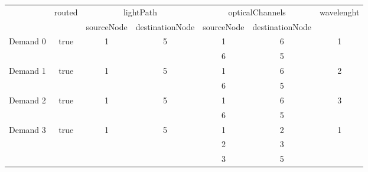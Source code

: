 \begin{table}[H]
	\centering
	\begin{tabular}{c|c|c|c|c|c|c|}
		\cline{2-7}
		\multicolumn{1}{l|}{}                           & \multirow{2}{*}{routed} & \multicolumn{2}{c|}{lightPath}          & \multicolumn{2}{c|}{opticalChannels} & \multirow{2}{*}{wavelenght} \\ \cline{3-6}
		\multicolumn{1}{l|}{}                           &                         & sourceNode         & destinationNode    & sourceNode     & destinationNode     &                             \\ \hline
		\multicolumn{1}{|l|}{\multirow{2}{*}{Demand 0}} & \multirow{2}{*}{true}   & \multirow{2}{*}{1} & \multirow{2}{*}{5} & 1              & 6                   & \multirow{2}{*}{1}          \\ \cline{5-6}
		\multicolumn{1}{|l|}{}                          &                         &                    &                    & 6              & 5                   &                             \\ \hline
		\multicolumn{1}{|l|}{\multirow{2}{*}{Demand 1}} & \multirow{2}{*}{true}   & \multirow{2}{*}{1} & \multirow{2}{*}{5} & 1              & 6                   & \multirow{2}{*}{2}          \\ \cline{5-6}
		\multicolumn{1}{|l|}{}                          &                         &                    &                    & 6              & 5                   &                             \\ \hline
		\multicolumn{1}{|c|}{\multirow{2}{*}{Demand 2}} & \multirow{2}{*}{true}   & \multirow{2}{*}{1} & \multirow{2}{*}{5} & 1              & 6                   & \multirow{2}{*}{3}          \\ \cline{5-6}
		\multicolumn{1}{|c|}{}                          &                         &                    &                    & 6              & 5                   &                             \\ \hline
		\multicolumn{1}{|c|}{\multirow{3}{*}{Demand 3}} & \multirow{3}{*}{true}   & \multirow{3}{*}{1} & \multirow{3}{*}{5} & 1              & 2                   & \multirow{3}{*}{1}          \\ \cline{5-6}
		\multicolumn{1}{|c|}{}                          &                         &                    &                    & 2              & 3                   &                             \\ \cline{5-6}
		\multicolumn{1}{|c|}{}                          &                         &                    &                    & 3              & 5                   &                             \\ \hline

\end{tabular}
\end{table}
